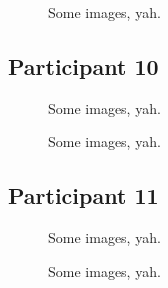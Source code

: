 \lipsum[1]

\clearpage

\begin{figure}[h]
	\caption{Some images, yah.}
\end{figure}

\lipsum[1]


\clearpage

\subsection{Participant 10}

\begin{figure}[h]
	\caption{Some images, yah.}
\end{figure}

\lipsum[1]

\clearpage

\begin{figure}[h]
	\caption{Some images, yah.}
\end{figure}

\lipsum[1]


\clearpage

\subsection{Participant 11}

\begin{figure}[h]
	\caption{Some images, yah.}
\end{figure}

\lipsum[1]

\clearpage

\begin{figure}[h]
	\caption{Some images, yah.}
\end{figure}

\lipsum[1]


